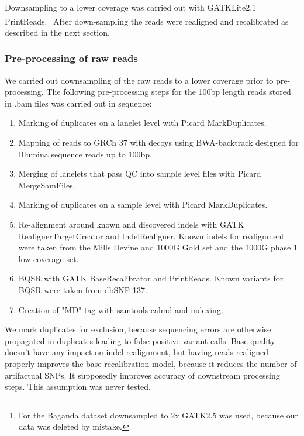 Downsampling to a lower coverage was carried out with \gls{GATK}Lite2.1 PrintReads.\cite{DePristo2011}\footnote{For the Baganda dataset downsampled to 2x \gls{GATK}2.5 was used, because our data was deleted by mistake.}
After down-sampling the reads were realigned and recalibrated as described in the next section.

\subsubsection{Pre-processing of raw reads}
We carried out downsampling of the raw reads to a lower coverage prior to pre-processing. The following pre-processing steps for the 100bp length reads stored in .bam files was carried out in sequence:
\begin{enumerate}
\item Marking of duplicates on a lanelet level with Picard MarkDuplicates.
\item Mapping of reads to \gls{GRCh} 37 with decoys using BWA-backtrack\cite{Li15072009} designed for Illumina sequence reads up to 100bp.
\item Merging of lanelets that pass \gls{QC} into sample level files with Picard MergeSamFiles.
\item Marking of duplicates on a sample level with Picard MarkDuplicates.
\item Re-alignment around known and discovered indels with \gls{GATK} RealignerTargetCreator and IndelRealigner. Known indels for realignment were taken from the Mills Devine and \gls{1000G} Gold set and the 1000G phase 1 low coverage set.
\item \Gls{BQSR} with \gls{GATK} BaseRecalibrator and PrintReads. Known variants for \gls{BQSR} were taken from dbSNP 137.
\item Creation of "MD" tag with samtools calmd and indexing.
\end{enumerate}

We mark duplicates for exclusion, because sequencing errors are otherwise propagated in duplicates leading to false positive variant calls. Base quality doesn't have any impact on indel realignment, but having reads realigned properly improves the base recalibration model, because it reduces the number of artifactual \glspl{SNP}. It supposedly improves accuracy of downstream processing steps. This assumption was never tested.

